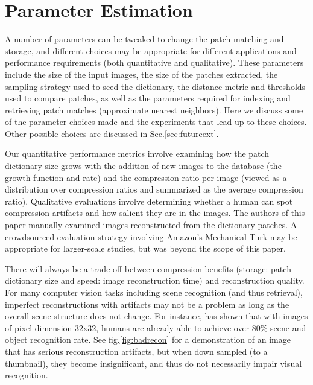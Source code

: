 \section{Parameter Estimation}\label{sec:analysis}

A number of parameters can be tweaked to change the patch matching and storage, and different choices may be appropriate for different applications and performance requirements (both quantitative and qualitative). These parameters include the size of the input images, the size of the patches extracted, the sampling strategy used to seed the dictionary, the distance metric and thresholds used to compare patches, as well as the parameters required for indexing and retrieving patch matches (approximate nearest neighbors). Here we discuss some of the parameter choices made and the experiments that lead up to these choices. Other possible choices are discussed in Sec.\ref{sec:futureext}.

Our quantitative performance metrics involve examining how the patch dictionary size grows with the addition of new images to the database (the growth function and rate) and the compression ratio per image (viewed as a distribution over compression ratios and summarized as the average compression ratio). Qualitative evaluations involve determining whether a human can spot compression artifacts and how salient they are in the images. The authors of this paper manually examined images reconstructed from the dictionary patches. A crowdsourced evaluation strategy involving Amazon's Mechanical Turk may be appropriate for larger-scale studies, but was beyond the scope of this paper.

There will always be a trade-off between compression benefits (storage: patch dictionary size and speed: image reconstruction time) and reconstruction quality. For many computer vision tasks including scene recognition (and thus retrieval), imperfect reconstructions with artifacts may not be a problem as long as the overall scene structure does not change. For instance, \cite{tiny_images} has shown that with images of pixel dimension 32x32, humans are already able to achieve over $80\%$ scene and object recognition rate. See fig.\ref{fig:badrecon} for a demonstration of an image that has serious reconstruction artifacts, but when down sampled (to a thumbnail), they become insignificant, and thus do not necessarily impair visual recognition.


